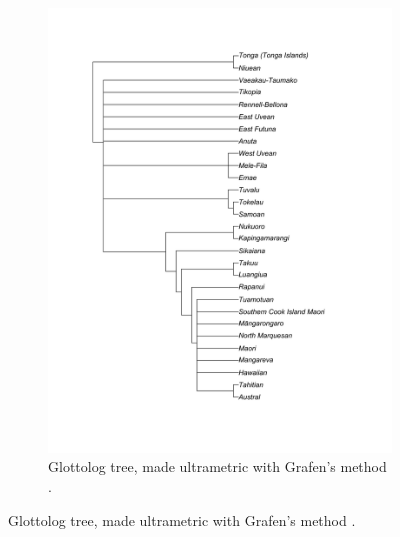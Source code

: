 \documentclass[12pt,letterpaper]{article}
\begin{document}
\begin{figure}[ht]
\begin{subfigure}{0.5\linewidth}
          \includegraphics[width=\textwidth]{illustrations/plots_from_R/tree_plots/poly_tree_example_brlen_glottolog_grafen.png}
     \caption{Glottolog tree, made ultrametric with Grafen's method \citep{grafen1989phylogenetic}.}
      \label{glottolog_example_poly_grafen}
    \end{subfigure}


\end{figure}
\end{document}
